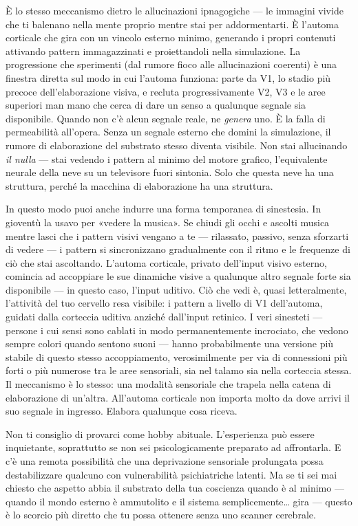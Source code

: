 \documentclass[11pt, twoside, openright]{book}
\begin{document}
È lo stesso meccanismo dietro le allucinazioni ipnagogiche --- le immagini vivide che ti balenano nella mente proprio mentre stai per addormentarti. È l'automa corticale che gira con un vincolo esterno minimo, generando i propri contenuti attivando pattern immagazzinati e proiettandoli nella simulazione. La progressione che sperimenti (dal rumore fioco alle allucinazioni coerenti) è una finestra diretta sul modo in cui l'automa funziona: parte da V1, lo stadio più precoce dell'elaborazione visiva, e recluta progressivamente V2, V3 e le aree superiori man mano che cerca di dare un senso a qualunque segnale sia disponibile. Quando non c'è alcun segnale reale, ne \textit{genera} uno. È la falla di permeabilità all'opera. Senza un segnale esterno che domini la simulazione, il rumore di elaborazione del substrato stesso diventa visibile. Non stai allucinando \textit{il nulla} --- stai vedendo i pattern al minimo del motore grafico, l'equivalente neurale della neve su un televisore fuori sintonia. Solo che questa neve ha una struttura, perché la macchina di elaborazione ha una struttura.

In questo modo puoi anche indurre una forma temporanea di sinestesia. In gioventù la usavo per «vedere la musica». Se chiudi gli occhi e ascolti musica mentre lasci che i pattern visivi vengano a te --- rilassato, passivo, senza sforzarti di vedere --- i pattern si sincronizzano gradualmente con il ritmo e le frequenze di ciò che stai ascoltando. L'automa corticale, privato dell'input visivo esterno, comincia ad accoppiare le sue dinamiche visive a qualunque altro segnale forte sia disponibile --- in questo caso, l'input uditivo. Ciò che vedi è, quasi letteralmente, l'attività del tuo cervello resa visibile: i pattern a livello di V1 dell'automa, guidati dalla corteccia uditiva anziché dall'input retinico. I veri sinesteti --- persone i cui sensi sono cablati in modo permanentemente incrociato, che vedono sempre colori quando sentono suoni --- hanno probabilmente una versione più stabile di questo stesso accoppiamento, verosimilmente per via di connessioni più forti o più numerose tra le aree sensoriali, sia nel talamo sia nella corteccia stessa. Il meccanismo è lo stesso: una modalità sensoriale che trapela nella catena di elaborazione di un'altra. All'automa corticale non importa molto da dove arrivi il suo segnale in ingresso. Elabora qualunque cosa riceva.

Non ti consiglio di provarci come hobby abituale. L'esperienza può essere inquietante, soprattutto se non sei psicologicamente preparato ad affrontarla. E c'è una remota possibilità che una deprivazione sensoriale prolungata possa destabilizzare qualcuno con vulnerabilità psichiatriche latenti. Ma se ti sei mai chiesto che aspetto abbia il substrato della tua coscienza quando è al minimo --- quando il mondo esterno è ammutolito e il sistema semplicemente… gira --- questo è lo scorcio più diretto che tu possa ottenere senza uno scanner cerebrale.
\end{document}
